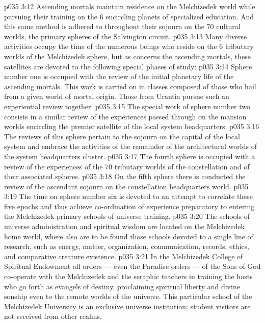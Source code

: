 \vs p035 3:12 Ascending mortals maintain residence on the Melchizedek world while pursuing their training on the 6 encircling planets of specialized education. And this same method is adhered to throughout their sojourn on the 70 cultural worlds, the primary spheres of the Salvington circuit.
\vs p035 3:13 \pc Many diverse activities occupy the time of the numerous beings who reside on the 6 tributary worlds of the Melchizedek sphere, but as concerns the ascending mortals, these satellites are devoted to the following special phases of study:
\vs p035 3:14 \bibnobreakspace Sphere number one is occupied with the review of the initial planetary life of the ascending mortals. This work is carried on in classes composed of those who hail from a given world of mortal origin. Those from Urantia pursue such an experiential review together.
\vs p035 3:15 \bibnobreakspace The special work of sphere number two consists in a similar review of the experiences passed through on the mansion worlds encircling the premier satellite of the local system headquarters.
\vs p035 3:16 \bibnobreakspace The reviews of this sphere pertain to the sojourn on the capital of the local system and embrace the activities of the remainder of the architectural worlds of the system headquarters cluster.
\vs p035 3:17 \bibnobreakspace The fourth sphere is occupied with a review of the experiences of the 70 tributary worlds of the constellation and of their associated spheres.
\vs p035 3:18 \bibnobreakspace On the fifth sphere there is conducted the review of the ascendant sojourn on the constellation headquarters world.
\vs p035 3:19 \bibnobreakspace The time on sphere number six is devoted to an attempt to correlate these five epochs and thus achieve co\hyp{}ordination of experience preparatory to entering the Melchizedek primary schools of universe training.
\vs p035 3:20 \pc The schools of universe administration and spiritual wisdom are located on the Melchizedek home world, where also are to be found those schools devoted to a single line of research, such as energy, matter, organization, communication, records, ethics, and comparative creature existence.
\vs p035 3:21 In the Melchizedek College of Spiritual Endowment all orders --- even the Paradise orders --- of the Sons of God co\hyp{}operate with the Melchizedek and the seraphic teachers in training the hosts who go forth as evangels of destiny, proclaiming spiritual liberty and divine sonship even to the remote worlds of the universe. This particular school of the Melchizedek University is an exclusive universe institution; student visitors are not received from other realms.
